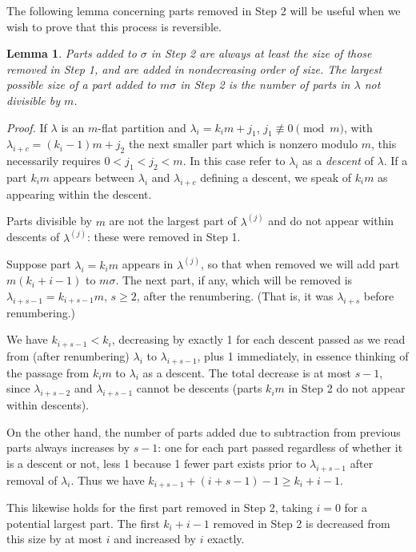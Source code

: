 \documentclass[11pt]{article}
\newtheorem{lemma}[theorem]{Lemma}
\begin{document}
The following lemma concerning parts removed in Step 2 will be useful when we wish to prove that this process is reversible.

\begin{lemma}\label{AngleLemma} Parts added to $\sigma$ in Step 2 are always at least the size of those removed in Step 1, and are added in nondecreasing order of size.  The largest possible size of a part added to $m\sigma$ in Step 2 is the number of parts in $\lambda$ not divisible by $m$.
\end{lemma}

\emph{Proof.} If $\lambda$ is an $m$-flat partition and $\lambda_i = k_im+j_1$, $j_1 \not\equiv 0 \pmod{m}$, with $\lambda_{i+c} = (k_i-1)m+j_2$ the next smaller part which is nonzero modulo $m$, this necessarily requires $0 < j_1 < j_2 < m$.  In this case refer to $\lambda_i$ as a \emph{descent} of $\lambda$.  If a part $k_i m$ appears between $\lambda_i$ and $\lambda_{i+c}$ defining a descent, we speak of $k_i m$ as appearing within the descent.

Parts divisible by $m$ are not the largest part of $\lambda^{(j)}$ and do not appear within descents of $\lambda^{(j)}$: these were removed in Step 1.

Suppose part $\lambda_i = k_im$ appears in $\lambda^{(j)}$, so that when removed we will add part $m(k_i+i-1)$ to $m\sigma$.  The next part, if any, which will be removed is $\lambda_{i+s-1} = k_{i+s-1}m$, $s\geq 2$, after the renumbering.  (That is, it was $\lambda_{i+s}$ before renumbering.)

We have $k_{i+s-1} < k_i$, decreasing by exactly 1 for each descent passed as we read from (after renumbering) $\lambda_i$ to $\lambda_{i+s-1}$, plus 1 immediately, in essence thinking of the passage from $k_im$ to $\lambda_i$ as a descent.  The total decrease is at most $s-1$, since $\lambda_{i+s-2}$ and $\lambda_{i+s-1}$ cannot be descents (parts $k_i m$ in Step 2 do not appear within descents).

On the other hand, the number of parts added due to subtraction from previous parts always increases by $s-1$: one for each part passed regardless of whether it is a descent or not, less 1 because 1 fewer part exists prior to $\lambda_{i+s-1}$ after removal of $\lambda_i$.  Thus we have $k_{i+s-1}+(i+s-1)-1 \geq k_i+i-1$.

This likewise holds for the first part removed in Step 2, taking $i=0$ for a potential largest part.  The first $k_i+i-1$ removed in Step 2 is decreased from this size by at most $i$ and increased by $i$ exactly.
\end{document}
